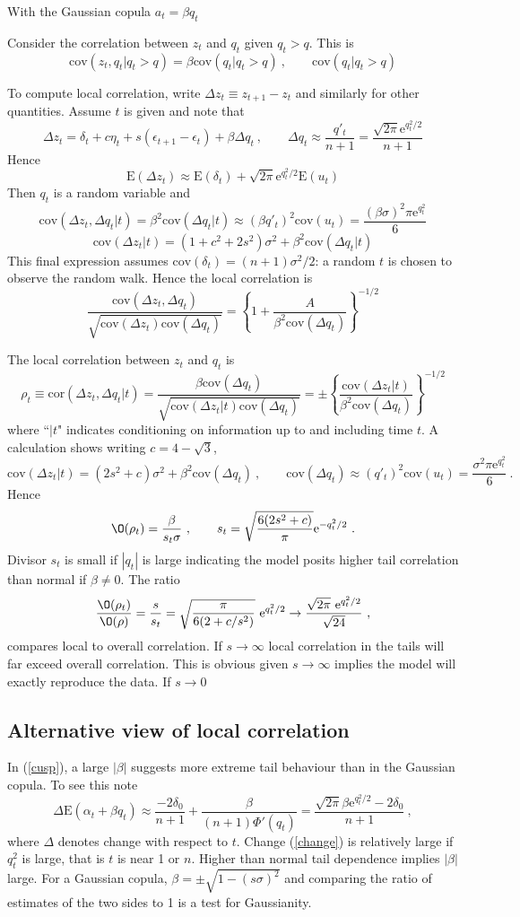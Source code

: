 \documentclass[authoryear]{elsarticle}
\newcommand{\E}{\mathrm{E}}
\newcommand{\e}{\mathrm{e}}
\newcommand{\cov}{\mathrm{cov}}
\newcommand{\eps}{\epsilon}
\newcommand{\cor}{\mathrm{cor}}
\newcommand{\eref}[1]{(\ref{#1})}
\newcommand{\cq}{\ , \qquad}
\newcommand{\be}[1]{\begin{equation}\label{#1}}
\newcommand{\ee}{\end{equation}}
\begin{document}
With the Gaussian copula $a_t=\beta q_t$

Consider the correlation between $z_t$ and $q_t$ given $q_t>q$.   This is
$$
\cov(z_t,q_t|q_t>q) = \beta\cov(q_t|q_t>q)\cq \cov(q_t|q_t>q)
$$


To compute local correlation, write $\Delta z_t\equiv z_{t+1}-z_t$ and similarly for other quantities.    Assume $t$ is given and note that 
$$
\Delta z_t =\delta_t +c\eta_t + s(\eps_{t+1}-\eps_t)+\beta\Delta q_t  \cq \Delta q_t\approx \frac{q'_t}{n+1} = \frac{\sqrt{2\pi}\e^{q_t^2/2}}{n+1}
$$
Hence
$$
\E(\Delta z_t) \approx \E(\delta_t) + \sqrt{2\pi}\e^{q_t^2/2}\E(u_t) 
$$
  Then $q_t$ is a random variable and 
$$
\cov(\Delta z_t,\Delta q_t|t) = \beta^2\cov(\Delta q_t|t)\approx (\beta q'_t)^2\cov(u_t)= \frac{(\beta\sigma)^2\pi\e^{q_t^2}}{6} 
$$$$
\cov(\Delta z_t|t) = (1+c^2 + 2s^2)\sigma^2 + \beta^2\cov(\Delta q_t|t) 
$$
This final expression assumes $\cov(\delta_t)=(n+1)\sigma^2/2$:  a random $t$ is chosen to observe the random walk. 
Hence the local correlation is 
$$
\frac{\cov(\Delta z_t,\Delta q_t)}{\sqrt{\cov(\Delta z_t)\cov(\Delta q_t)}} = \left\{1+\frac{A}{\beta^2\cov(\Delta q_t)}\right\}^{-1/2}
$$ 

The local correlation between $z_t$ and $q_t$ is 
$$
\rho_t\equiv\cor(\Delta z_t,\Delta q_t|t) =  \frac{\beta\cov(\Delta q_t)}{\sqrt{\cov(\Delta z_t|t)\cov(\Delta q_t)}}=\pm\left\{\frac{\cov(\Delta z_t|t)}{\beta^2\cov(\Delta q_t)}\right\}^{-1/2} 
$$
where ``$|t$" indicates conditioning on information up to and including time $t$.   A calculation shows writing $c=4-\sqrt 3$,
$$
\cov(\Delta z_t|t)  = (2s^2+c)\sigma^2+\beta^2\cov(\Delta q_t)\cq \cov(\Delta q_t) \approx (q'_t)^2\cov(u_t)= \frac{\sigma^2\pi\e^{q_t^2}}{6}
\ .
$$
Hence
$$
\O(\rho_t) = \frac{\beta}{s_t\sigma }
\cq 
s_t = \sqrt{\frac{6(2s^2+c)}{\pi}}\e^{-q_t^2/2}\ .
$$
Divisor $s_t$ is small if $|q_t|$ is large indicating the model posits higher tail correlation than normal if $\beta\ne 0$.  The ratio
$$
\frac{\O(\rho_t)}{\O(\rho)} =\frac{s}{s_t}= \sqrt{\frac{\pi}{6(2+c/s^2)}}\ \e^{q_t^2/2}\rightarrow \frac{\sqrt{2\pi}\ \e^{q_t^2/2}}{\sqrt{24}}\ ,
$$
compares local  to overall correlation.  If $s\rightarrow\infty$ local correlation in the tails  will far exceed overall  correlation.  This is obvious given $s\rightarrow\infty$ implies the model will exactly reproduce the data.  If $s\rightarrow0$

\subsection{Alternative view of local correlation}
In \eref{cusp},  a large $|\beta|$ suggests more extreme tail behaviour than in the Gaussian copula.  To see this note  
 \be{change}
\Delta \E( \alpha_t + \beta q_t)  \approx \frac{-2\delta_0}{n+1} + \frac{\beta}{(n+1)\Phi'(q_t)}= \frac{\sqrt{2\pi}\beta\e^{q_t^2/2}-2\delta_0}{n+1}\ ,
 \ee
 where $\Delta$ denotes change with respect to $t$.
Change \eref{change} is relatively large if $q_t^2$ is large, that is $t$ is near 1 or $n$. Higher than normal tail dependence implies $|\beta|$ large.  For a Gaussian copula, $\beta=\pm\sqrt{1-(s\sigma)^2}$ and comparing the ratio of estimates of the two sides to 1 is a test for Gaussianity.
\end{document}
